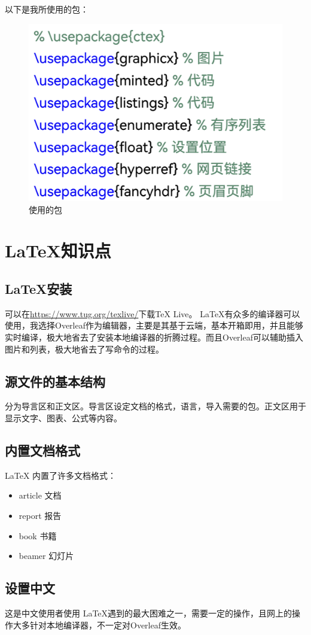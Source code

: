 \documentclass[fontset=ubuntu]{ctexart}
\begin{document}
以下是我所使用的包：
\begin{figure}[htb]
    \centering
    \includegraphics[width=0.5\linewidth]{package_1.png}
    \caption{使用的包}
    \label{fig:package_1}
\end{figure}

\section{ \LaTeX 知识点}
\subsection{ \LaTeX 安装}
可以在\url{https://www.tug.org/texlive/}下载TeX Live。 \LaTeX 有众多的编译器可以使用，我选择Overleaf作为编辑器，主要是其基于云端，基本开箱即用，并且能够实时编译，极大地省去了安装本地编译器的折腾过程。而且Overleaf可以辅助插入图片和列表，极大地省去了写命令的过程。

\subsection{源文件的基本结构}
分为导言区和正文区。导言区设定文档的格式，语言，导入需要的包。正文区用于显示文字、图表、公式等内容。

\subsection{内置文档格式}
 \LaTeX{} 内置了许多文档格式：
 \begin{itemize}
     \item article 文档
     \item report 报告
     \item book 书籍
     \item beamer 幻灯片
 \end{itemize}

\subsection{设置中文}
这是中文使用者使用 \LaTeX 遇到的最大困难之一，需要一定的操作，且网上的操作大多针对本地编译器，不一定对Overleaf生效。
\end{document}
